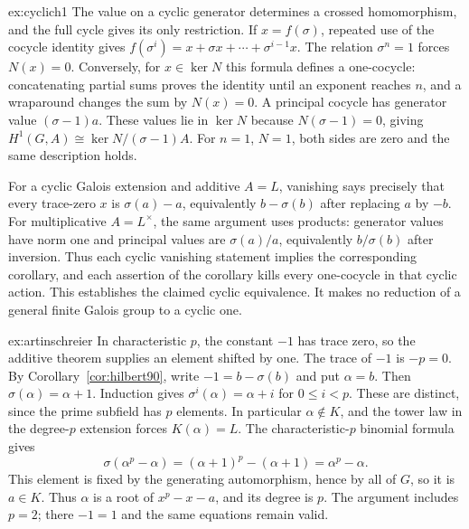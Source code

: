 \begin{solution}{ex:cyclich1}
\idea The value on a cyclic generator determines a crossed homomorphism, and the full cycle gives its only restriction.
\writeup If $x=f(\sigma)$, repeated use of the cocycle identity gives
$f(\sigma^i)=x+\sigma x+\cdots+\sigma^{i-1}x$.
The relation $\sigma^n=1$ forces $N(x)=0$. Conversely, for $x\in\ker N$ this formula defines a one-cocycle: concatenating partial sums proves the identity until an exponent reaches $n$, and a wraparound changes the sum by $N(x)=0$. A principal cocycle has generator value $(\sigma-1)a$. These values lie in $\ker N$ because $N(\sigma-1)=0$, giving
$H^1(G,A)\cong\ker N/(\sigma-1)A$.
For $n=1$, $N=1$, both sides are zero and the same description holds.

For a cyclic Galois extension and additive $A=L$, vanishing says precisely that every trace-zero $x$ is $\sigma(a)-a$, equivalently $b-\sigma(b)$ after replacing $a$ by $-b$. For multiplicative $A=L^\times$, the same argument uses products: generator values have norm one and principal values are $\sigma(a)/a$, equivalently $b/\sigma(b)$ after inversion. Thus each cyclic vanishing statement implies the corresponding corollary, and each assertion of the corollary kills every one-cocycle in that cyclic action. This establishes the claimed cyclic equivalence. It makes no reduction of a general finite Galois group to a cyclic one.
\end{solution}

\begin{solution}{ex:artinschreier}
\idea In characteristic $p$, the constant $-1$ has trace zero, so the additive theorem supplies an element shifted by one.
\writeup The trace of $-1$ is $-p=0$. By Corollary~\ref{cor:hilbert90}, write
$-1=b-\sigma(b)$ and put $\alpha=b$. Then $\sigma(\alpha)=\alpha+1$. Induction gives
$\sigma^i(\alpha)=\alpha+i$ for $0\le i<p$. These are distinct, since the prime subfield has $p$ elements. In particular $\alpha\notin K$, and the tower law in the degree-$p$ extension forces $K(\alpha)=L$.
The characteristic-$p$ binomial formula gives
\[
\sigma(\alpha^p-\alpha)
=(\alpha+1)^p-(\alpha+1)=\alpha^p-\alpha.
\]
This element is fixed by the generating automorphism, hence by all of $G$, so it is $a\in K$. Thus $\alpha$ is a root of $x^p-x-a$, and its degree is $p$. The argument includes $p=2$; there $-1=1$ and the same equations remain valid.
\end{solution}

